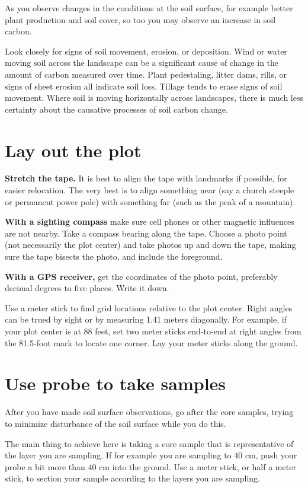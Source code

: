 \documentclass[11pt,letterpaper,oneside,onecolumn]{memoir}
\begin{document}
As you observe changes in the conditions at the soil surface, for example better plant production and soil cover, so too you may observe an increase in soil carbon.

Look closely for signs of soil movement, erosion, or deposition. Wind or water moving soil across the landscape can be a significant cause of change in the amount of carbon measured over time. Plant pedestaling, litter dams, rills, or signs of sheet erosion all indicate soil loss. Tillage tends to erase signs of soil movement. Where soil is moving horizontally across landscapes, there is much less certainty about the causative processes of soil carbon change.

\section{Lay out the plot}

\textbf{Stretch the tape.} It is best to align the tape with landmarks if possible, for easier relocation. The very best is to align something near (say a church steeple or permanent power pole) with something far (such as the peak of a mountain).

\textbf{With a sighting compass} make sure cell phones or other magnetic influences are not nearby. Take a compass bearing along the tape. Choose a photo point (not necessarily the plot center) and take photos up and down the tape, making sure the tape bisects the photo, and include the foreground.

\textbf{With a GPS receiver,} get the coordinates of the photo point, preferably decimal degrees to five places. Write it down.

Use a meter stick to find grid locations relative to the plot center. Right angles can be trued by sight or by measuring 1.41 meters diagonally. For example, if your plot center is at 88 feet, set two meter sticks end-to-end at right angles from the 81.5-foot mark to locate one corner. Lay your meter sticks along the ground.

\section{Use probe to take samples}

After you have made soil surface observations, go after the core samples, trying to minimize disturbance of the soil surface while you do this.

The main thing to achieve here is taking a core sample that is representative of the layer you are sampling. If for example you are sampling to 40 cm, push your probe a bit more than 40 cm into the ground. Use a meter stick, or half a meter stick, to section your sample according to the layers you are sampling.
\end{document}
